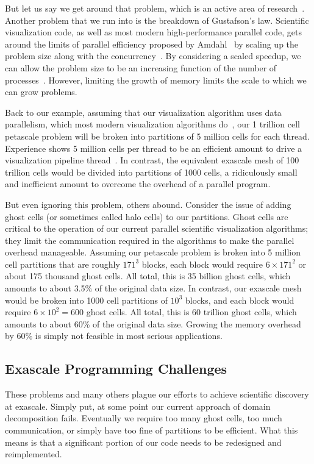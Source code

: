 \documentclass[conference]{IEEEtran}
\newcommand*{\lcite}[1]{~\cite{#1}}
\begin{document}
But let us say we get around that problem, which is an active area of
research\lcite{Balaji2011}.  Another problem that we run into is the
breakdown of Gustafson's law.  Scientific visualization code, as well as
most modern high-performance parallel code, gets around the limits of
parallel efficiency proposed by Amdahl\lcite{Amdahl1967} by scaling up the
problem size along with the concurrency\lcite{Gustafson1988}.  By
considering a scaled speedup, we can allow the problem size to be an
increasing function of the number of processes\lcite{Quinn2004}.  However,
limiting the growth of memory limits the scale to which we can grow
problems.

Back to our example, assuming that our visualization algorithm uses data
parallelism, which most modern visualization algorithms
do\lcite{Moreland2012:TVCG}, our 1 trillion cell petascale problem will be
broken into partitions of 5 million cells for each thread.  Experience
shows 5 million cells per thread to be an efficient amount to drive a
visualization pipeline thread\lcite{ParaViewTutorial}.  In contrast, the
equivalent exascale mesh of 100 trillion cells would be divided into
partitions of 1000 cells, a ridiculously small and inefficient amount to
overcome the overhead of a parallel program.

But even ignoring this problem, others abound.  Consider the issue of
adding ghost cells (or sometimes called halo cells) to our partitions.
Ghost cells are critical to the operation of our current parallel
scientific visualization algorithms; they limit the communication required
in the algorithms to make the parallel overhead manageable.  Assuming our
petascale problem is broken into 5 million cell partitions that are roughly
$171^3$ blocks, each block would require $6 \times 171^2$ or about 175
thousand ghost cells.  All total, this is 35 billion ghost cells, which
amounts to about 3.5\% of the original data size.  In contrast, our
exascale mesh would be broken into 1000 cell partitions of $10^3$ blocks,
and each block would require $6 \times 10^2 = 600$ ghost cells.  All total,
this is 60 trillion ghost cells, which amounts to about 60\% of the
original data size.  Growing the memory overhead by 60\% is simply not
feasible in most serious applications.

\subsection{Exascale Programming Challenges}

\noindent
These problems and many others plague our efforts to achieve scientific
discovery at exascale.  Simply put, at some point our current approach of
domain decomposition fails.  Eventually we require too many ghost cells,
too much communication, or simply have too fine of partitions to be
efficient.  What this means is that a significant portion of our code needs
to be redesigned and reimplemented.
\end{document}
